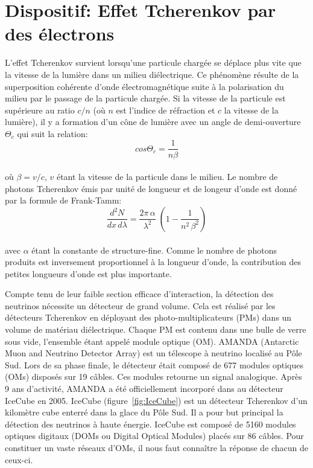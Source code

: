 \section{Dispositif: Effet Tcherenkov par des électrons}
\label{sect:Tcherenkov_electron}

L'effet Tcherenkov survient lorsqu'une particule chargée se déplace plus vite que la vitesse de la lumière dans un milieu diélectrique. Ce phénomène résulte de la superposition cohérente d'onde électromagnétique suite à la polarisation du milieu par le passage de la particule chargée. Si la vitesse de la particule est supérieure au ratio $c/n$ (où $n$ est l'indice de réfraction et $c$ la vitesse de la lumière), il y a formation d'un cône de lumière avec un angle de demi-ouverture $\Theta_c$ qui suit la relation:
\begin{equation}
    cos\Theta_c = \frac{1}{n\beta}
\end{equation}\\
où $\beta = v/c$, $v$ étant la vitesse de la particule dans le milieu. Le nombre de photons Tcherenkov émis par unité de longueur et de longeur d'onde est donné par la formule de Frank-Tamm:
\begin{equation}
     \frac{d^2N}{dx \, d\lambda} = \frac{2\pi \, \alpha}{\lambda^2} \; (1- \frac{1}{n^2 \, \beta^2} )
\end{equation}\\
avec $\alpha$ étant la constante de structure-fine. Comme le nombre de photons produits est inversement proportionnel à la longueur d'onde, la contribution des petites longueurs d'onde est plus importante.

Compte tenu de leur faible section efficace d'interaction, la détection des neutrinos nécessite un détecteur de grand volume. Cela est réalisé par les détecteurs Tcherenkov en déployant des photo-multiplicateurs (PMs) dans un volume de matériau diélectrique. Chaque PM est contenu dans une bulle de verre sous vide, l'ensemble étant appelé module optique (OM). AMANDA (Antarctic Muon and Neutrino Detector Array) est un télescope à neutrino localisé au Pôle Sud. Lors de sa phase finale, le détecteur était composé de 677 modules optiques (OMs) disposés sur 19 câbles. Ces modules retourne un signal analogique. Après 9 ans d'activité, AMANDA a été officiellement incorporé dans au détecteur IceCube en 2005. IceCube (figure~\ref{fig:IceCube}) est un détecteur Tcherenkov d'un kilomètre cube enterré dans la glace du Pôle Sud. Il a pour but principal la détection des neutrinos à haute énergie. IceCube est composé de 5160 modules optiques digitaux (DOMs ou Digital Optical Modules) placés sur 86 câbles. Pour constituer un vaste réseaux d'OMs, il nous faut connaître la réponse de chacun de ceux-ci.

